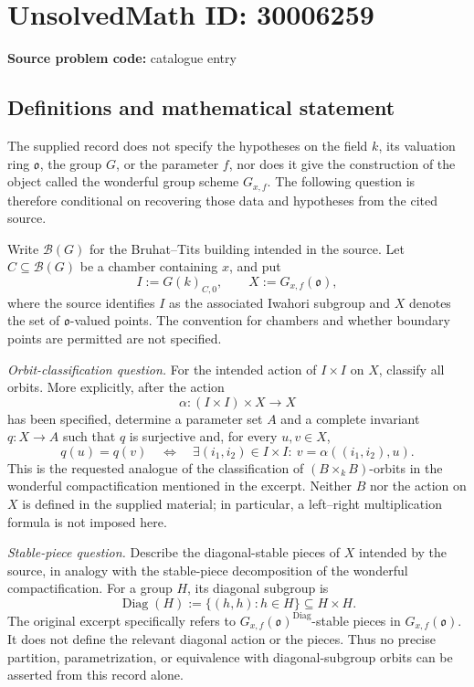 \documentclass[11pt]{article}
\begin{document}
\section*{UnsolvedMath ID: 30006259}
\textbf{Source problem code:} catalogue entry
\subsection{Definitions and mathematical statement}
The supplied record does not specify the hypotheses on the field \(k\), its valuation ring \(\mathfrak{o}\), the group \(G\), or the parameter \(f\), nor does it give the construction of the object called the wonderful group scheme \(G_{x,f}\). The following question is therefore conditional on recovering those data and hypotheses from the cited source.

Write \(\mathcal{B}(G)\) for the Bruhat--Tits building intended in the source. Let \(C\subseteq\mathcal{B}(G)\) be a chamber containing \(x\), and put
\[
I:=G(k)_{C,0},\qquad X:=G_{x,f}(\mathfrak{o}),
\]
where the source identifies \(I\) as the associated Iwahori subgroup and \(X\) denotes the set of \(\mathfrak{o}\)-valued points. The convention for chambers and whether boundary points are permitted are not specified.

\emph{Orbit-classification question.} For the intended action of \(I\times I\) on \(X\), classify all orbits. More explicitly, after the action
\[
\alpha:(I\times I)\times X\longrightarrow X
\]
has been specified, determine a parameter set \(A\) and a complete invariant \(q:X\to A\) such that \(q\) is surjective and, for every \(u,v\in X\),
\[
q(u)=q(v)
\quad\Longleftrightarrow\quad
\exists(i_1,i_2)\in I\times I:\ v=\alpha((i_1,i_2),u).
\]
This is the requested analogue of the classification of \((B\times_k B)\)-orbits in the wonderful compactification mentioned in the excerpt. Neither \(B\) nor the action on \(X\) is defined in the supplied material; in particular, a left--right multiplication formula is not imposed here.

\emph{Stable-piece question.} Describe the diagonal-stable pieces of \(X\) intended by the source, in analogy with the stable-piece decomposition of the wonderful compactification. For a group \(H\), its diagonal subgroup is
\[
\operatorname{Diag}(H):=\{(h,h):h\in H\}\subseteq H\times H.
\]
The original excerpt specifically refers to \(G_{x,f}(\mathfrak{o})^{\operatorname{Diag}}\)-stable pieces in \(G_{x,f}(\mathfrak{o})\). It does not define the relevant diagonal action or the pieces. Thus no precise partition, parametrization, or equivalence with diagonal-subgroup orbits can be asserted from this record alone.
\end{document}
